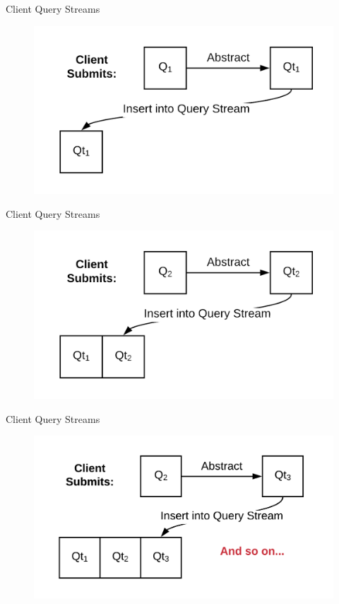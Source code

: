 \documentclass[10pt]{beamer}
\begin{document}
\begin{frame}[fragile]{Client Query Streams}
    \begin{figure}
        \includegraphics[scale=0.2]{apollo_client_query_stream_0_3}
    \end{figure}
\end{frame}

\begin{frame}[fragile]{Client Query Streams}
    \begin{figure}
        \includegraphics[scale=0.2]{apollo_client_query_stream_0_4}
    \end{figure}
\end{frame}

\begin{frame}[fragile]{Client Query Streams}
    \begin{figure}
        \includegraphics[scale=0.2]{apollo_client_query_stream_0_5}
    \end{figure}
\end{frame}
\end{document}
